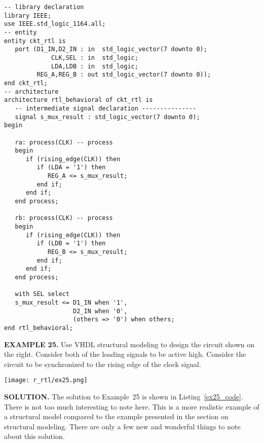 \noindent
\begin{minipage}{0.99\linewidth}
\begin{lstlisting}[label=ex24_code, caption=Solution to Example~24.]
-- library declaration
library IEEE;
use IEEE.std_logic_1164.all;
-- entity
entity ckt_rtl is
   port (D1_IN,D2_IN : in  std_logic_vector(7 downto 0);
             CLK,SEL : in  std_logic;
             LDA,LDB : in  std_logic;
         REG_A,REG_B : out std_logic_vector(7 downto 0));
end ckt_rtl;
-- architecture
architecture rtl_behavioral of ckt_rtl is
   -- intermediate signal declaration ---------------
   signal s_mux_result : std_logic_vector(7 downto 0);
begin

   ra: process(CLK) -- process
   begin
      if (rising_edge(CLK)) then
         if (LDA = '1') then
            REG_A <= s_mux_result;
         end if;
      end if;
   end process;

   rb: process(CLK) -- process
   begin
      if (rising_edge(CLK)) then
         if (LDB = '1') then
            REG_B <= s_mux_result;
         end if;
      end if;
   end process;

   with SEL select
   s_mux_result <= D1_IN when '1',
                   D2_IN when '0',
                   (others => '0') when others;
end rtl_behavioral;
\end{lstlisting}
\end{minipage}

\begin{leftbar}
\begin{minipage}[t]{0.5\textwidth}
\vspace{10pt}
\noindent
\textbf{EXAMPLE 25.}
Use VHDL structural modeling to design the circuit shown on the right. Consider both of the loading signals to be active high. Consider the circuit to be synchronized to the rising edge of the clock signal.
\end{minipage}
\begin{minipage}[t]{0.47\textwidth}
\vspace{0pt}\raggedright
    \centering
	\texttt{[image: r\_rtl/ex25.png]}
\end{minipage}
\end{leftbar}
\noindent
\textbf{SOLUTION.} The solution to Example~25 is shown in Listing~\ref{ex25_code}. There is not too much interesting to note here. This is a more realistic example of a structural model compared to the example presented in the section on structural modeling. There are only a few new and wonderful things to note about this solution.

